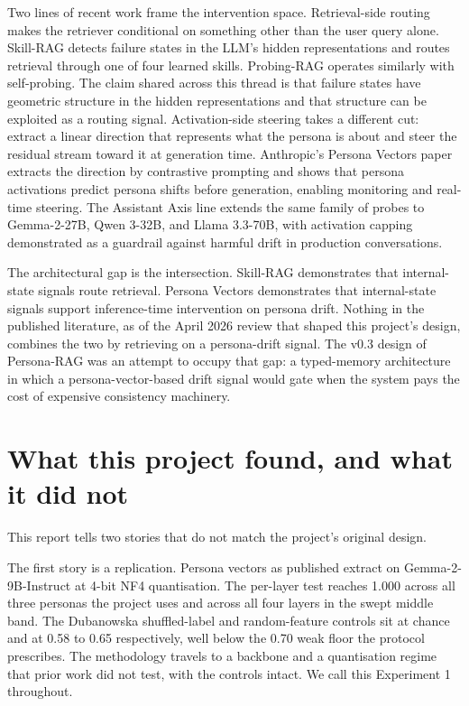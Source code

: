 Two lines of recent work frame the intervention space. Retrieval-side routing makes the retriever conditional on something other than the user query alone. Skill-RAG detects failure states in the LLM's hidden representations and routes retrieval through one of four learned skills\autocite{wei2026skillrag}. Probing-RAG operates similarly with self-probing\autocite{baek2025probingrag}. The claim shared across this thread is that failure states have geometric structure in the hidden representations and that structure can be exploited as a routing signal. Activation-side steering takes a different cut: extract a linear direction that represents what the persona is about and steer the residual stream toward it at generation time. Anthropic's Persona Vectors paper extracts the direction by contrastive prompting and shows that persona activations predict persona shifts before generation, enabling monitoring and real-time steering\autocite{chen2025personavectors}. The Assistant Axis line extends the same family of probes to Gemma-2-27B, Qwen 3-32B, and Llama 3.3-70B, with activation capping demonstrated as a guardrail against harmful drift in production conversations\autocite{lu2026assistantaxis}.

The architectural gap is the intersection. Skill-RAG demonstrates that internal-state signals route retrieval. Persona Vectors demonstrates that internal-state signals support inference-time intervention on persona drift. Nothing in the published literature, as of the April 2026 review that shaped this project's design, combines the two by retrieving on a persona-drift signal. The v0.3 design of Persona-RAG was an attempt to occupy that gap: a typed-memory architecture in which a persona-vector-based drift signal would gate when the system pays the cost of expensive consistency machinery.

\section{What this project found, and what it did not}
\label{sec:intro-findings}

This report tells two stories that do not match the project's original design.

The first story is a replication. Persona vectors as published\autocite{chen2025personavectors} extract on Gemma-2-9B-Instruct at 4-bit NF4 quantisation. The per-layer test \auroc{} reaches 1.000 across all three personas the project uses and across all four layers in the swept middle band. The Dubanowska shuffled-label and random-feature controls sit at chance and at 0.58 to 0.65 respectively, well below the 0.70 weak floor the protocol prescribes. The methodology travels to a backbone and a quantisation regime that prior work did not test, with the controls intact. We call this Experiment 1 throughout.

